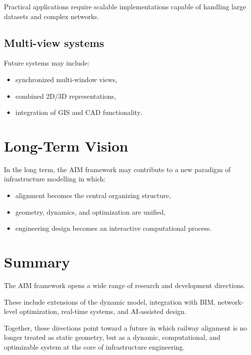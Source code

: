Practical applications require scalable implementations capable of
handling large datasets and complex networks.

\subsection{Multi-view systems}

Future systems may include:
\begin{itemize}
\item synchronized multi-window views,
\item combined 2D/3D representations,
\item integration of GIS and CAD functionality.
\end{itemize}


\section{Long-Term Vision}

In the long term, the AIM framework may contribute to a new paradigm of
infrastructure modelling in which:
\begin{itemize}
\item alignment becomes the central organizing structure,
\item geometry, dynamics, and optimization are unified,
\item engineering design becomes an interactive computational process.
\end{itemize}


\section{Summary}

\begin{summary}
The AIM framework opens a wide range of research and development
directions.

These include extensions of the dynamic model, integration with BIM,
network-level optimization, real-time systems, and AI-assisted design.

Together, these directions point toward a future in which railway
alignment is no longer treated as static geometry, but as a dynamic,
computational, and optimizable system at the core of infrastructure
engineering.
\end{summary}
